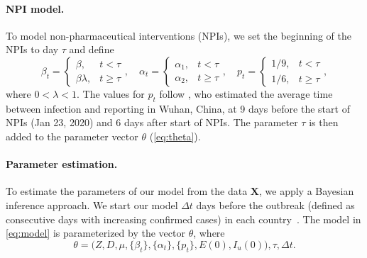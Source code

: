 \documentclass[12pt]{extarticle}
\let\vec\mathbf
\begin{document}
\paragraph*{NPI model.}
To model non-pharmaceutical interventions (NPIs), we set the beginning of the NPIs to day $\tau$ and define
\begin{equation} \label{eq:NPI_model}
\beta_t = \begin{cases} 
  \beta, & t < \tau \\ %
  \beta \lambda, & t \ge \tau
\end{cases},
\quad
\alpha_t = \begin{cases} 
  \alpha_1, & t < \tau \\ %
  \alpha_2, & t \ge \tau
\end{cases},
\quad
p_t = \begin{cases} 
  1/9, & t < \tau \\ %
  1/6, & t \ge \tau
\end{cases},
\end{equation}
where $0 < \lambda < 1$.
The values for $p_t$ follow \citet{Li2020}, who estimated the average time between infection and reporting in Wuhan, China, at 9 days before the start of NPIs (Jan 23, 2020) and 6 days after start of NPIs.
The parameter $\tau$ is then added to the parameter vector $\theta$ (\autoref{eq:theta}).



\paragraph*{Parameter estimation.}
To estimate the parameters of our model from the data $\vec{X}$, we apply a Bayesian inference approach.
We start our model $\Delta t$ days before the outbreak (defined as consecutive days with increasing confirmed cases) in each country~\citep{Gatto2020}.
The model in \autoref{eq:model} is parameterized by the vector $\theta$, where
\begin{equation} \label{eq:theta}
\theta=\Big(Z, D, \mu, \{\beta_t\}, \{\alpha_t\}, \{p_t\}, E(0), I_u(0)\Big), \tau, \Delta t.
\end{equation} 
\end{document}
